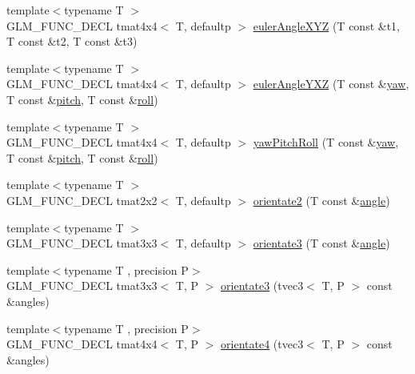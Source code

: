 \begin{DoxyCompactItemize}
\item 
{\footnotesize template$<$typename T $>$ }\\G\+L\+M\+\_\+\+F\+U\+N\+C\+\_\+\+D\+E\+C\+L tmat4x4$<$ T, defaultp $>$ \hyperlink{group__gtx__euler__angles_gaaedda1657a1aebe0a904d864b33844e8}{euler\+Angle\+X\+Y\+Z} (T const \&t1, T const \&t2, T const \&t3)
\item 
{\footnotesize template$<$typename T $>$ }\\G\+L\+M\+\_\+\+F\+U\+N\+C\+\_\+\+D\+E\+C\+L tmat4x4$<$ T, defaultp $>$ \hyperlink{group__gtx__euler__angles_ga0242b5ab68651db70c6025815549427f}{euler\+Angle\+Y\+X\+Z} (T const \&\hyperlink{group__gtc__quaternion_ga724a5df282b70cec0a6cb0d6dcddb6d6}{yaw}, T const \&\hyperlink{group__gtc__quaternion_ga2c08b93a4261c10748fd4d2104346f17}{pitch}, T const \&\hyperlink{group__gtc__quaternion_ga4fd705376c6c1fd667be0055a0ea58ec}{roll})
\item 
{\footnotesize template$<$typename T $>$ }\\G\+L\+M\+\_\+\+F\+U\+N\+C\+\_\+\+D\+E\+C\+L tmat4x4$<$ T, defaultp $>$ \hyperlink{group__gtx__euler__angles_gaf9c8d0f1df88c5344165600774489bc5}{yaw\+Pitch\+Roll} (T const \&\hyperlink{group__gtc__quaternion_ga724a5df282b70cec0a6cb0d6dcddb6d6}{yaw}, T const \&\hyperlink{group__gtc__quaternion_ga2c08b93a4261c10748fd4d2104346f17}{pitch}, T const \&\hyperlink{group__gtc__quaternion_ga4fd705376c6c1fd667be0055a0ea58ec}{roll})
\item 
{\footnotesize template$<$typename T $>$ }\\G\+L\+M\+\_\+\+F\+U\+N\+C\+\_\+\+D\+E\+C\+L tmat2x2$<$ T, defaultp $>$ \hyperlink{group__gtx__euler__angles_ga6f465681cbbc575ad93a53ec918dacf3}{orientate2} (T const \&\hyperlink{group__gtc__quaternion_gad4a4448baedb198b2b1e7880d2544dc9}{angle})
\item 
{\footnotesize template$<$typename T $>$ }\\G\+L\+M\+\_\+\+F\+U\+N\+C\+\_\+\+D\+E\+C\+L tmat3x3$<$ T, defaultp $>$ \hyperlink{group__gtx__euler__angles_gab188e2526dea3c003e86e298f618085e}{orientate3} (T const \&\hyperlink{group__gtc__quaternion_gad4a4448baedb198b2b1e7880d2544dc9}{angle})
\item 
{\footnotesize template$<$typename T , precision P$>$ }\\G\+L\+M\+\_\+\+F\+U\+N\+C\+\_\+\+D\+E\+C\+L tmat3x3$<$ T, P $>$ \hyperlink{group__gtx__euler__angles_ga33f0d790cecd8337ee83f8e3a8109b11}{orientate3} (tvec3$<$ T, P $>$ const \&angles)
\item 
{\footnotesize template$<$typename T , precision P$>$ }\\G\+L\+M\+\_\+\+F\+U\+N\+C\+\_\+\+D\+E\+C\+L tmat4x4$<$ T, P $>$ \hyperlink{group__gtx__euler__angles_ga4e25c9468b6f002c76e9a2412bcfa503}{orientate4} (tvec3$<$ T, P $>$ const \&angles)

\end{DoxyCompactItemize}
